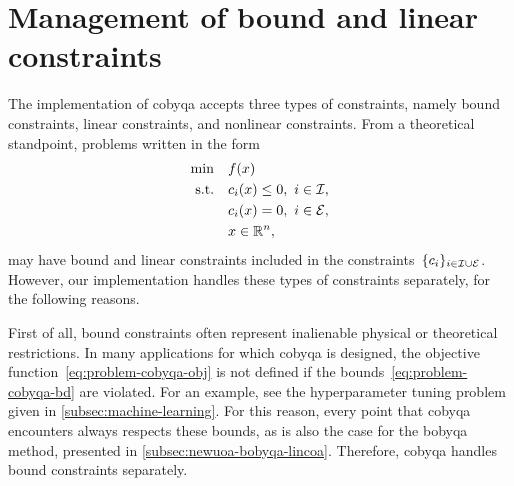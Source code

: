 \section{Management of bound and linear constraints}
\label{sec:simple-constraints}

The implementation of \gls{cobyqa} accepts three types of constraints, namely bound constraints, linear constraints, and nonlinear constraints.
From a theoretical standpoint, problems written in the form
\begin{align*}
    \min        & \quad \obj(\iter)\\
    \text{s.t.} & \quad \con{i}(\iter) \le 0, ~ i \in \iub,\\
                & \quad \con{i}(\iter) = 0, ~ i \in \ieq,\\
                & \quad \iter \in \R^n,
\end{align*}
may have bound and linear constraints included in the constraints~$\{c_{i}\}_{i \in \mathcal{I} \cup \mathcal{E}}$.
However, our implementation handles these types of constraints separately, for the following reasons.

First of all, bound constraints often represent inalienable physical or theoretical restrictions.
In many applications for which \gls{cobyqa} is designed, the objective function~\cref{eq:problem-cobyqa-obj} is not defined if the bounds~\cref{eq:problem-cobyqa-bd} are violated.
For an example, see the hyperparameter tuning problem given in \cref{subsec:machine-learning}.
For this reason, every point that \gls{cobyqa} encounters always respects these bounds, as is also the case for the \gls{bobyqa} method, presented in \cref{subsec:newuoa-bobyqa-lincoa}.
Therefore, \gls{cobyqa} handles bound constraints separately.

